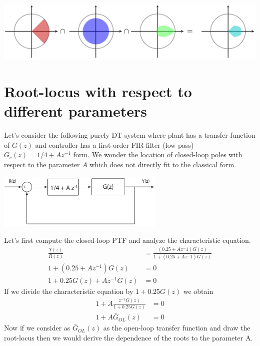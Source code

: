 \documentclass[twoside]{article}
\begin{document}
\begin{center}
\begin{minipage}[h]{\linewidth}
    \begin{center}
      \includegraphics[width=\textwidth]{region}
    \end{center}
\end{minipage}
\end{center}

\section*{Root-locus with respect to different parameters}

Let's consider the following purely DT system where plant has a 
transfer function of $G(z)$ and controller has a first order FIR
filter (low-pass)
$G_c(z) = 1/4 + A z^{-1}$ form. We wonder the location of closed-loop
poles with respect to the parameter $A$ which does not directly fit to
the classical form. 

\begin{center}
\begin{minipage}[h]{\linewidth}
    \begin{center}
      \includegraphics[width=0.6\textwidth]{distdiff}
    \end{center}
\end{minipage}
\end{center}

Let's first compute the closed-loop PTF and analyze the characteristic
equation.
%
\begin{align*}
  \frac{Y(z)}{R(z)} &= \frac{ \left(0.25 + A z^-1 \right) G(z) }{1 +
                      \left (0.25 + A z^-1 \right) G(z)} 
\\
1 + \left( 0.25 + A z^{-1} \right) G(z) &= 0
\\
1 + 0.25 G(z) + A z^{-1} G(z) &= 0
\end{align*}
%
If we divide the characteristic equation by $1 + 0.25 G(z)$ we obtain
%
\begin{align*}
1+ A \frac{z^{-1} G(z)}{1 + 0.25 G(z)} &= 0
\\
1+ A \bar{G}_{OL}(z) &= 0
\end{align*}
%
Now if we consider as $\bar{G}_{OL}(z)$ as the open-loop transfer
function and draw the root-locus then we would derive the dependence 
of the roots to the parameter A. 
\end{document}
